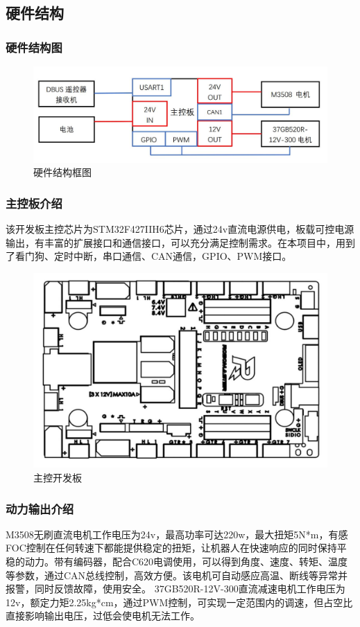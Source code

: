 \documentclass[a4paper, 11pt]{article}   %
\begin{document}
\begin{CJK}{UTF8}{gbsn}
\begin{spacing}{1.15}
\subsection{硬件结构}
\subsubsection{硬件结构图}
 \begin{figure}[H]
\centering
\includegraphics[width=.95\textwidth]{chap5//fig4.jpg}
\caption{硬件结构框图}
\end{figure}
\subsubsection{主控板介绍}
该开发板主控芯片为STM32F427IIH6芯片，通过24v直流电源供电，板载可控电源输出，有丰富的扩展接口和通信接口，可以充分满足控制需求。在本项目中，用到了看门狗、定时中断，串口通信、CAN通信，GPIO、PWM接口。
 \begin{figure}[H]
\centering
\includegraphics[width=.8\textwidth]{chap5//fig5.jpg}
\caption{主控开发板}
\end{figure}
\subsubsection{动力输出介绍}
M3508无刷直流电机工作电压为24v，最高功率可达220w，最大扭矩5N*m，有感FOC控制在任何转速下都能提供稳定的扭矩，让机器人在快速响应的同时保持平稳的动力。带有编码器，配合C620电调使用，可以得到角度、速度、转矩、温度等参数，通过CAN总线控制，高效方便。该电机可自动感应高温、断线等异常并报警，同时反馈故障，使用安全。
37GB520R-12V-300直流减速电机工作电压为12v，额定力矩2.25kg*cm，通过PWM控制，可实现一定范围内的调速，但占空比直接影响输出电压，过低会使电机无法工作。

\end{spacing}
\end{CJK}
\end{document}
